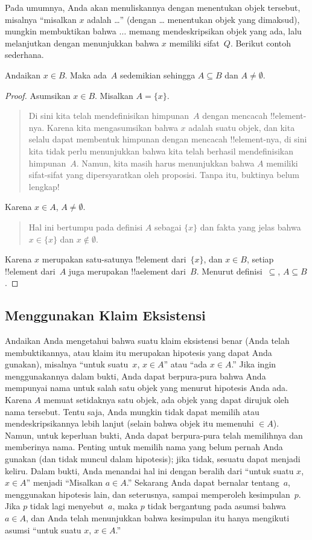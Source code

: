 \documentclass[../../../include/open-logic-section]{subfiles}
\begin{document}
Pada umumnya, Anda akan menuliskannya dengan menentukan objek tersebut,
misalnya ``misalkan $x$ adalah \dots'' (dengan \dots{} menentukan objek
yang dimaksud), mungkin membuktikan bahwa $\dots$ memang
mendeskripsikan objek yang ada, lalu melanjutkan dengan menunjukkan
bahwa $x$ memiliki sifat~$Q$. Berikut contoh sederhana.

\begin{prop}
  Andaikan $x \in B$. Maka ada~$A$ sedemikian sehingga $A \subseteq B$
  dan $A \neq \emptyset$.
\end{prop}

\begin{proof}
  Asumsikan $x \in B$. Misalkan $A = \{x\}$.
  \begin{quote}
    Di sini kita telah mendefinisikan himpunan~$A$ dengan mencacah
    !!{element}-nya. Karena kita mengasumsikan bahwa $x$ adalah suatu
    objek, dan kita selalu dapat membentuk himpunan dengan mencacah
    !!{element}-nya, di sini kita tidak perlu menunjukkan bahwa kita
    telah berhasil mendefinisikan himpunan~$A$. Namun, kita masih harus
    menunjukkan bahwa $A$ memiliki sifat-sifat yang dipersyaratkan
    oleh proposisi. Tanpa itu, buktinya belum lengkap!{}
  \end{quote}
  Karena $x \in A$, $A \neq \emptyset$.
  \begin{quote}
    Hal ini bertumpu pada definisi $A$ sebagai $\{x\}$ dan fakta yang
    jelas bahwa $x \in \{x\}$ dan $x \notin \emptyset$.
  \end{quote}
  Karena $x$ merupakan satu-satunya !!{element} dari~$\{x\}$, dan $x
  \in B$, setiap !!{element} dari~$A$ juga merupakan !!a{element}
  dari~$B$. Menurut definisi~$\subseteq$, $A \subseteq B$.
\end{proof}

\subsection{Menggunakan Klaim Eksistensi}

Andaikan Anda mengetahui bahwa suatu klaim eksistensi benar (Anda
telah membuktikannya, atau klaim itu merupakan hipotesis yang dapat
Anda gunakan), misalnya ``untuk suatu~$x$, $x \in A$'' atau ``ada $x
\in A$.'' Jika ingin menggunakannya dalam bukti, Anda dapat berpura-pura
bahwa Anda mempunyai nama untuk salah satu objek yang menurut hipotesis
Anda ada. Karena $A$ memuat setidaknya satu objek, ada objek yang dapat
dirujuk oleh nama tersebut. Tentu saja, Anda mungkin tidak dapat
memilih atau mendeskripsikannya lebih lanjut (selain bahwa objek itu
memenuhi $\in A$). Namun, untuk keperluan bukti, Anda dapat berpura-pura
telah memilihnya dan memberinya nama. Penting untuk memilih nama yang
belum pernah Anda gunakan (dan tidak muncul dalam hipotesis); jika
tidak, sesuatu dapat menjadi keliru. Dalam bukti, Anda menandai hal
ini dengan beralih dari ``untuk suatu $x$, $x \in A$'' menjadi
``Misalkan $a \in A$.'' Sekarang Anda dapat bernalar tentang~$a$,
menggunakan hipotesis lain, dan seterusnya, sampai memperoleh
kesimpulan~$p$. Jika $p$ tidak lagi menyebut~$a$, maka $p$ tidak
bergantung pada asumsi bahwa $a \in A$, dan Anda telah menunjukkan
bahwa kesimpulan itu hanya mengikuti asumsi ``untuk suatu $x$, $x \in
A$.''
\end{document}
